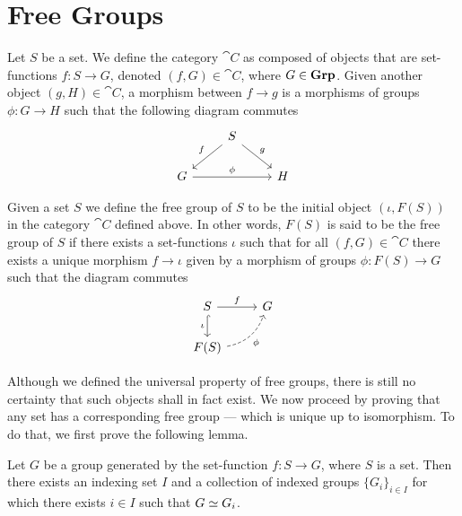 \section{Free Groups}

Let \(S\) be a set. We define the category \(\cat C\) as composed of objects
that are set-functions \(f: S \to G\), denoted \((f, G) \in \cat C\), where \(G
\in {\textbf{Grp}}\). Given another object \((g, H) \in \cat C\), a morphism between \(f
\to g\) is a morphisms of groups \(\phi: G \to H\) such that the following
diagram commutes
\[
  \begin{tikzcd}
    &S \ar[dr, "g"] \ar[dl, swap, "f"] & \\
    G \ar[rr, "\phi"] & &H
  \end{tikzcd}
\]

\begin{proposition}
\label{prop:free-group-universal-property}
Given a set \(S\) we define the free group of \(S\) to be the initial object
\((\iota, F(S))\) in the category \(\cat C\) defined above. In other words,
\(F(S)\) is said to be the free group of \(S\) if there exists a set-functions
\(\iota\) such that for all \((f, G) \in \cat C\) there exists a unique morphism
\(f \to \iota\) given by a morphism of groups \(\phi: F(S) \to G\) such that the
diagram commutes
\[
  \begin{tikzcd}
    S \ar[d, swap, hook, "\iota"] \ar[r, "f"] & G \\
    F(S) \ar[ur, dashed, bend right, swap, "\phi"] &
  \end{tikzcd}
\]
\end{proposition}

Although we defined the universal property of free groups, there is still no
certainty that such objects shall in fact exist. We now proceed by proving that
any set has a corresponding free group --- which is unique up to isomorphism. To
do that, we first prove the following lemma.

\begin{lemma}\label{lem:isomorphism-indexing-set-group}
Let \(G\) be a group generated by the set-function \(f: S \to G\), where
\(S\) is a set. Then there exists an indexing set \(I\) and a collection of
indexed groups \(\{G_i\}_{i \in I}\) for which there exists \(i \in I\) such
that \(G \simeq G_i\).
\end{lemma}

